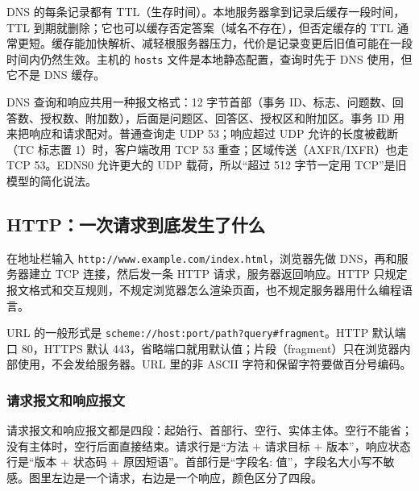 DNS 的每条记录都有 TTL（生存时间）。本地服务器拿到记录后缓存一段时间，TTL 到期就删除；它也可以缓存否定答案（域名不存在），但否定缓存的 TTL 通常更短。缓存能加快解析、减轻根服务器压力，代价是记录变更后旧值可能在一段时间内仍然生效。主机的 \texttt{hosts} 文件是本地静态配置，查询时先于 DNS 使用，但它不是 DNS 缓存。

DNS 查询和响应共用一种报文格式：12 字节首部（事务 ID、标志、问题数、回答数、授权数、附加数），后面是问题区、回答区、授权区和附加区。事务 ID 用来把响应和请求配对。普通查询走 UDP 53；响应超过 UDP 允许的长度被截断（TC 标志置 1）时，客户端改用 TCP 53 重查；区域传送（AXFR/IXFR）也走 TCP 53。EDNS0 允许更大的 UDP 载荷，所以“超过 512 字节一定用 TCP”是旧模型的简化说法。

\subsection{HTTP：一次请求到底发生了什么}

在地址栏输入 \texttt{http://www.example.com/index.html}，浏览器先做 DNS，再和服务器建立 TCP 连接，然后发一条 HTTP 请求，服务器返回响应。HTTP 只规定报文格式和交互规则，不规定浏览器怎么渲染页面，也不规定服务器用什么编程语言。

URL 的一般形式是 \texttt{scheme://host:port/path?query\#fragment}。HTTP 默认端口 80，HTTPS 默认 443，省略端口就用默认值；片段（fragment）只在浏览器内部使用，不会发给服务器。URL 里的非 ASCII 字符和保留字符要做百分号编码。

\subsubsection{请求报文和响应报文}

请求报文和响应报文都是四段：起始行、首部行、空行、实体主体。空行不能省；没有主体时，空行后面直接结束。请求行是“方法 + 请求目标 + 版本”，响应状态行是“版本 + 状态码 + 原因短语”。首部行是“字段名: 值”，字段名大小写不敏感。图里左边是一个请求，右边是一个响应，颜色区分了四段。

